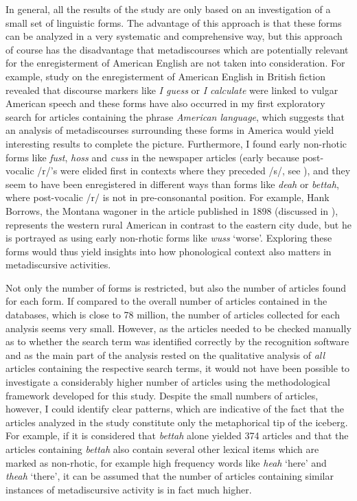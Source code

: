In general, all the results of the study are only based on an investigation of a small set of linguistic forms. The advantage of this approach is that these forms can be analyzed in a very systematic and comprehensive way, but this approach of course has the disadvantage that metadiscourses which are potentially relevant for the enregisterment of American English are not taken into consideration. For example,  study on the enregisterment of American English in British fiction revealed that discourse markers like \textit{I guess} or \textit{I calculate} were linked to vulgar American speech and these forms have also occurred in my first exploratory search for articles containing the phrase \emph{American language}, which suggests that an analysis of metadiscourses surrounding these forms in America would yield interesting results to complete the picture. Furthermore, I found early non-rhotic forms like \emph{fust}, \emph{hoss} and \emph{cuss} in the newspaper articles (early because post-vocalic /r/’s were elided first in contexts where they preceded /s/, see ), and they seem to have been enregistered in different ways than forms like \emph{deah} or \emph{bettah}, where post-vocalic /r/ is not in pre-consonantal position. For example, Hank Borrows, the Montana wagoner in the article published in 1898 (discussed in ), represents the western rural American in contrast to the eastern city dude, but he is portrayed as using early non-rhotic forms like \emph{wuss} ‘worse’. Exploring these forms would thus yield insights into how phonological context also matters in metadiscursive activities.

Not only the number of forms is restricted, but also the number of articles found for each form. If compared to the overall number of articles contained in the databases, which is close to 78 million, the number of articles collected for each analysis seems very small. However, as the articles needed to be checked manually as to whether the search term was identified correctly by the recognition software and as the main part of the analysis rested on the qualitative analysis of \emph{all} articles containing the respective search terms, it would not have been possible to investigate a considerably higher number of articles using the methodological framework developed for this study. Despite the small numbers of articles, however, I could identify clear patterns, which are indicative of the fact that the articles analyzed in the study constitute only the metaphorical tip of the iceberg. For example, if it is considered that \emph{bettah} alone yielded 374 articles and that the articles containing \emph{bettah} also contain several other lexical items which are marked as non-rhotic, for example high frequency words like \emph{heah} ‘here’ and \emph{theah} ‘there’, it can be assumed that the number of articles containing similar instances of metadiscursive activity is in fact much higher.

